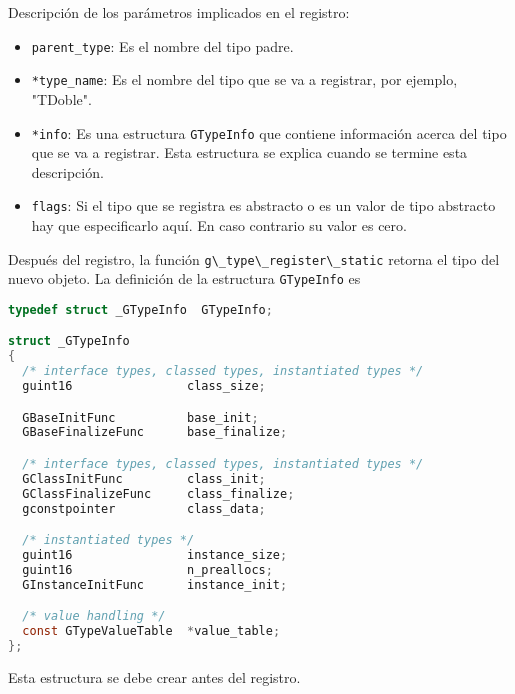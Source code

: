 Descripción de los parámetros implicados en el registro:
\begin{itemize}
  \tightlist
\item \texttt{parent\_type}: Es el nombre del tipo padre.
\item \texttt{*type\_name}: Es el nombre del tipo que se va a registrar,
  por ejemplo, "\textsf{TDoble}".
\item \texttt{*info}: Es una estructura \texttt{GTypeInfo} que contiene información acerca
  del tipo que se va a registrar. Esta estructura se explica cuando se termine esta
  descripción.
\item \texttt{flags}: Si el tipo que se registra es abstracto o es un valor de tipo
  abstracto\footnotemark{} hay que especificarlo aquí. En caso contrario su valor es cero.
\end{itemize}
Después del registro, la función \passthrough{\lstinline!g\_type\_register\_static!} retorna
el tipo del nuevo objeto. La definición de la estructura \texttt{GTypeInfo} es
\begin{lstlisting}[language=C]
typedef struct _GTypeInfo  GTypeInfo;

struct _GTypeInfo
{
  /* interface types, classed types, instantiated types */
  guint16                class_size;

  GBaseInitFunc          base_init;
  GBaseFinalizeFunc      base_finalize;

  /* interface types, classed types, instantiated types */
  GClassInitFunc         class_init;
  GClassFinalizeFunc     class_finalize;
  gconstpointer          class_data;

  /* instantiated types */
  guint16                instance_size;
  guint16                n_preallocs;
  GInstanceInitFunc      instance_init;

  /* value handling */
  const GTypeValueTable  *value_table;
};
\end{lstlisting}

Esta estructura se debe crear antes del registro.

